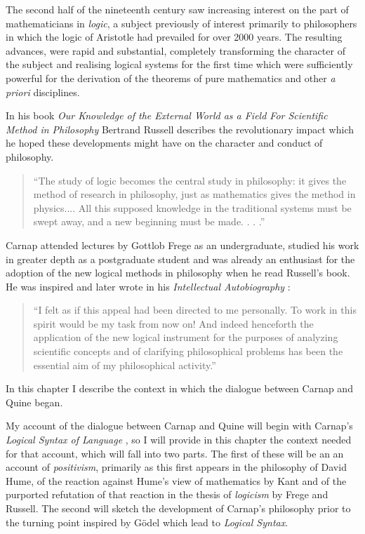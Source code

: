 The second half of the nineteenth century saw increasing interest on the part of mathematicians
in \emph{logic}, a subject previously of interest primarily to philosophers
in which the logic of Aristotle had prevailed for over 2000 years.
The resulting advances, were rapid and substantial, completely transforming the character
of the subject and realising logical systems for the first time which were sufficiently powerful
for the derivation of the theorems of pure mathematics and other \emph{a priori} disciplines.  

In his book \emph{Our Knowledge of the External World as a Field For Scientific Method in Philosophy} \cite{russell21} Bertrand Russell describes the revolutionary impact which he hoped these developments might have on the character and conduct of philosophy.

\begin{quote}
``The study of logic becomes the central study in philosophy: it gives the method of research in philosophy, just as mathematics gives the method in physics....	
All this supposed knowledge in the traditional systems must be swept away, and a new beginning must be made. . . .''
\end{quote}

Carnap attended lectures by Gottlob Frege as an undergraduate, studied his work in greater depth as a postgraduate student
and was already an enthusiast for the adoption of the new logical methods in philosophy when he read Russell's
book.
He was inspired and later wrote in his \emph{Intellectual Autobiography}
\cite{carnap63}:

\begin{quotation}
``I felt as if this appeal had been directed to me personally.
To work in this spirit would be my task from now on! And indeed henceforth the application of the new logical instrument for the purposes of analyzing scientific concepts and of clarifying philosophical problems has been the essential aim of my philosophical activity.''
\end{quotation}

In this chapter I describe the context in which the dialogue between
Carnap and Quine began.

My account of the dialogue between Carnap and Quine will begin with Carnap's {\it Logical Syntax of Language} \cite{carnap34, carnap37}, so I will provide in this chapter the context needed for that account, which will fall into two parts.
The first of these will be an an account of \emph{positivism}, primarily as this first appears in the philosophy of David Hume, of the reaction against Hume's view of mathematics by Kant and of the purported refutation of that reaction in the thesis of \emph{logicism} by Frege and Russell.
The second will sketch the development of Carnap's philosophy prior to the turning point inspired by G\"odel which lead to {\it Logical Syntax}.


